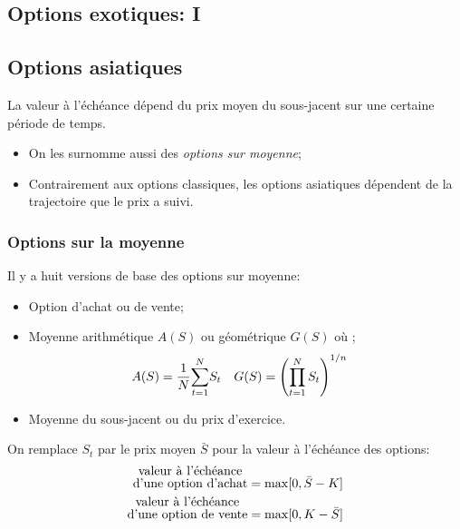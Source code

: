 \documentclass[10pt, french]{article}
\begin{document}
\begin{multicols*}{2}

\newpage

\setcounter{section}{13}
\section{Options exotiques: I}
\subsection{Options asiatiques}
\begin{definitionNOHFILL}
La valeur à l'échéance dépend du prix moyen du sous-jacent sur une certaine période de temps.

\tcbline

\begin{itemize}[leftmargin = *]
	\item	On les surnomme aussi des \textit{options sur moyenne};
	\item	Contrairement aux options classiques, les options asiatiques dépendent de la trajectoire que le prix a suivi.
\end{itemize}
\end{definitionNOHFILL}

\subsubsection*{Options sur la moyenne}

Il y a huit versions de base des options sur moyenne:
\begin{itemize}[leftmargin = *]
	\item	Option d'achat ou de vente;
	\item	Moyenne arithmétique $A(S)$ ou géométrique $G(S)$ où ;
		\begin{align*}
		A(S)	
		&=	\frac{1}{N}\overset{N}{\underset{t = 1}{\sum}}S_{t}	&
		G(S)	
		&=	\left(\prod_{t = 1}^{N} S_{t}\right)^{1/n}
		\end{align*}
	\item	Moyenne du sous-jacent ou du prix d'exercice.
\end{itemize}

\begin{definitionNOHFILLsub}
On remplace $S_{t}$ par le prix moyen $\bar{S}$ pour la valeur à l'échéance des options:\\
\begin{align*}
	\shortstack{valeur à l'échéance\\ d'une option d'achat}
	&=	\max[0, \bar{S}	-	K]	\\
	\shortstack{valeur à l'échéance\\ d'une option de vente}
	&=	\max[0, 	K	-	\bar{S}]
\end{align*}
\end{definitionNOHFILLsub}


\end{multicols*}
\end{document}
